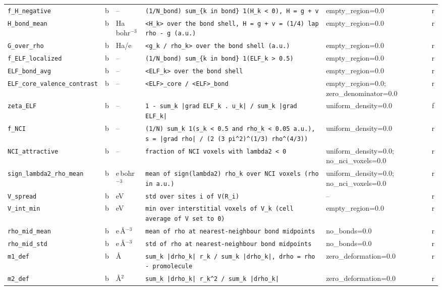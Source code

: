 \begin{table}[p]
\begin{tabular}{p{3.3cm}cp{1.4cm}p{6.6cm}p{2.3cm}c}
\texttt{f\_H\_negative} & b & -- & \texttt{(1/N\_bond) sum\_\{k in bond\} 1(H\_k < 0),  H = g + v} & empty\_region=0.0 & r \\
\texttt{H\_bond\_mean} & b & Ha\,bohr$^{-3}$ & \texttt{<H\_k> over the bond shell,  H = g + v = (1/4) lap rho - g (a.u.)} & empty\_region=0.0 & r \\
\texttt{G\_over\_rho} & b & Ha/e & \texttt{<g\_k / rho\_k> over the bond shell (a.u.)} & empty\_region=0.0 & r \\
\texttt{f\_ELF\_localized} & b & -- & \texttt{(1/N\_bond) sum\_\{k in bond\} 1(ELF\_k > 0.5)} & empty\_region=0.0 & r \\
\texttt{ELF\_bond\_avg} & b & -- & \texttt{<ELF\_k> over the bond shell} & empty\_region=0.0 & r \\
\texttt{ELF\_core\_valence\_contrast} & b & -- & \texttt{<ELF>\_core / <ELF>\_bond} & empty\_region=0.0; zero\_denominator=0.0 & r \\
\texttt{zeta\_ELF} & b & -- & \texttt{1 - sum\_k |grad ELF\_k . u\_k| / sum\_k |grad ELF\_k|} & uniform\_density=0.0 & f \\
\texttt{f\_NCI} & b & -- & \texttt{(1/N) sum\_k 1(s\_k < 0.5 and rho\_k < 0.05 a.u.),  s = |grad rho| / (2 (3 pi\^{}2)\^{}(1/3) rho\^{}(4/3))} & uniform\_density=0.0 & r \\
\texttt{NCI\_attractive} & b & -- & \texttt{fraction of NCI voxels with lambda2 < 0} & uniform\_density=0.0; no\_nci\_voxels=0.0 & r \\
\texttt{sign\_lambda2\_rho\_mean} & b & e\,bohr$^{-3}$ & \texttt{mean of sign(lambda2) rho\_k over NCI voxels (rho in a.u.)} & uniform\_density=0.0; no\_nci\_voxels=0.0 & r \\
\texttt{V\_spread} & b & eV & \texttt{std over sites i of V(R\_i)} & -- & r \\
\texttt{V\_int\_min} & b & eV & \texttt{min over interstitial voxels of V\_k (cell average of V set to 0)} & empty\_region=0.0 & r \\
\texttt{rho\_mid\_mean} & b & e\,\AA$^{-3}$ & \texttt{mean of rho at nearest-neighbour bond midpoints} & no\_bonds=0.0 & r \\
\texttt{rho\_mid\_std} & b & e\,\AA$^{-3}$ & \texttt{std of rho at nearest-neighbour bond midpoints} & no\_bonds=0.0 & r \\
\texttt{m1\_def} & b & \AA & \texttt{sum\_k |drho\_k| r\_k / sum\_k |drho\_k|,  drho = rho - promolecule} & zero\_deformation=0.0 & r \\
\texttt{m2\_def} & b & \AA$^2$ & \texttt{sum\_k |drho\_k| r\_k\^{}2 / sum\_k |drho\_k|} & zero\_deformation=0.0 & r \\

\end{tabular}
\end{table}
